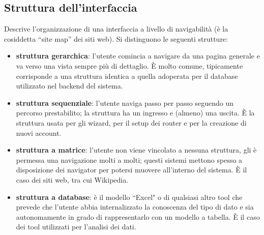\subsection*{Struttura dell'interfaccia}
Descrive l'organizzazione di una interfaccia a livello di navigabilità (è la cosiddetta ``site map'' dei siti web).
Si distinguono le seguenti strutture:
\begin{itemize}
	\itemsep-0.3em
	\item \textbf{struttura gerarchica}: l'utente comincia a navigare da una pagina generale e va verso una vista sempre più di dettaglio. \`E molto
	comune, tipicamente corrisponde a una struttura identica a quella adoperata per il database utilizzato nel backend del sistema.
	\item \textbf{struttura sequenziale}: l'utente naviga passo per passo seguendo un percorso prestabilito; la struttura ha un ingresso e (almeno) una
	uscita. \`E la struttura usata per gli wizard, per il setup dei router e per la creazione di nuovi account.
	\item \textbf{struttura a matrice}: l'utente non viene vincolato a nessuna struttura, gli è permessa una navigazione molti a molti; questi sistemi
	mettono spesso a disposizione dei navigator per potersi muovere all'interno del sistema. \`E il caso dei siti web, tra cui Wikipedia.
	\item \textbf{struttura a database}: è il modello ``Excel" o di qualsiasi altro tool che prevede che l'utente abbia internalizzato la conoscenza del
	tipo di dato e sia autonomamente in grado di rappresentarlo con un modello a tabella. \`E il caso dei tool utilizzati per l'analisi dei dati.
\end{itemize}

